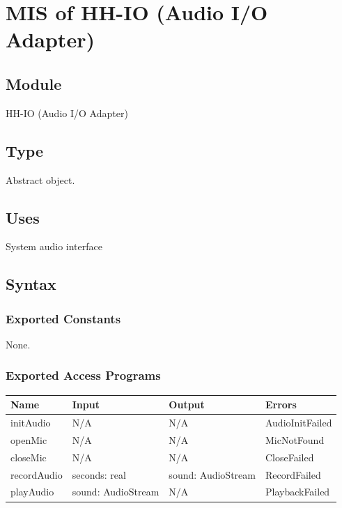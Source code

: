 \documentclass[12pt, titlepage]{article}
\begin{document}
\newpage

\section{MIS of HH-IO (Audio I/O Adapter)} \label{mod:HHIO}

\subsection{Module}

HH-IO (Audio I/O Adapter)

\subsection{Type}

Abstract object.

\subsection{Uses}

System audio interface

\subsection{Syntax}

\subsubsection{Exported Constants}

None.

\subsubsection{Exported Access Programs}

\begin{center}
\begin{tabular}{p{2.7cm} p{4cm} p{4cm} p{2.5cm}}
\hline
\textbf{Name} & \textbf{Input} & \textbf{Output} & \textbf{Errors} \\
\hline
initAudio & N/A & N/A & AudioInitFailed \\
openMic & N/A & N/A & MicNotFound \\
closeMic & N/A & N/A & CloseFailed \\
recordAudio & seconds: real & sound: AudioStream & RecordFailed \\
playAudio & sound: AudioStream & N/A & PlaybackFailed \\
\hline
\end{tabular}
\end{center}
\end{document}

